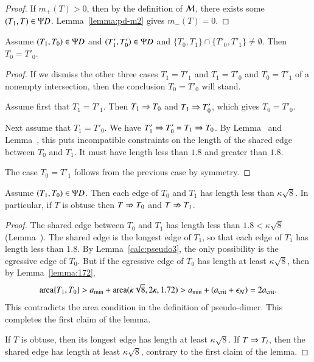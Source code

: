 \begin{proof}  
  If $m_+(T)>0$, then by the definition of $\mathcal M$, there exists some $(T_1,T)\in\Psi D$.  
  Lemma~\ref{lemma:pd-m2} gives $m_-(T)=0$.
\end{proof}

\begin{lemma}  
  Assume $(T_1,T_0)\in \Psi D$ and $(T'_1,T'_0)\in\Psi D$ and
  $\{T_0,T_1\}\cap\{T'_0,T'_1\} \ne \emptyset$.  Then $T_0 = T'_0$.
\end{lemma}

\begin{proof}  
  If we dismiss the other three cases $T_1=T'_1$ and $T_1=T'_0$ and
  $T_0=T'_1$ of a nonempty intersection, then the conclusion $T_0 =
  T'_0$ will stand.

  Assume first that $T_1 = T'_1$.  Then $T_1\Rightarrow T_0$ and $T_1\Rightarrow
  T'_0$, which gives $T_0=T'_0$.

  Next assume that $T_1=T'_0$.  We have $T'_1\Rightarrow T'_0 = T_1 \Rightarrow T_0$.
  By Lemma~ and
  Lemma~, this puts incompatible constraints on the
  length of the shared edge between $T_0$ and $T_1$.  It must have
  length less than $1.8$ and greater than $1.8$.

  The case $T_0=T'_1$ follows from the previous case by symmetry.
\end{proof}

\begin{lemma}
  Assume $(T_1,T_0)\in\Psi D$.  Then each edge of $T_0$ and $T_1$ has
  length less than $\kappa\sqrt8$.  In particular, if $T$ is obtuse
  then $T\nRightarrow T_0$ and $T \nRightarrow T_1$.
\end{lemma}

\begin{proof} 
  The shared edge between $T_0$ and $T_1$ has length less than $1.8 <
  \kappa\sqrt8$ (Lemma~).  The shared edge is the
  longest edge of $T_1$, so that each edge of $T_1$ has length less
  than $1.8$.  By Lemma~\ref{calc:pseudo3}, the only possibility is the egressive edge of $T_0$.
  But if the egressive edge of $T_0$ has length at least
  $\kappa\sqrt8$, then by Lemma~\ref{lemma:172},
\[
{\operatorname{area}}\{T_1,T_0\} > a_\text{min} + {\operatorname{area}}(\kappa\sqrt8,2\kappa,1.72) 
> a_\text{min} + (a_\text{crit} + \epsilon_{\mathcal N}) = 2a_\text{crit}.
\]
This contradicts the area condition in the definition of pseudo-dimer.
This completes the first claim of the lemma.

If $T$ is obtuse, then its longest edge has length at least
$\kappa\sqrt8$.  If $T\Rightarrow T_i$, then the shared edge has length at
least $\kappa\sqrt8$, contrary to the first claim of the lemma.
\end{proof}

